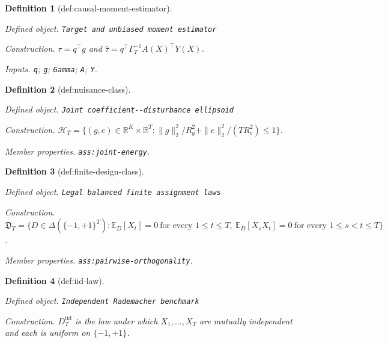 \documentclass{article}
\newtheorem{definition}{Definition}
\begin{document}
\begin{definition}[def:causal-moment-estimator]\label{def:causal-moment-estimator}
\par\smallskip\noindent\emph{Defined object.} \texttt{Target and unbiased moment estimator}
\par\smallskip\noindent\emph{Construction.} \(\tau=q^{\top}g\) and \(\widehat\tau=q^{\top}\Gamma_T^{-1}A(X)^{\top}Y(X)\).
\par\smallskip\noindent\emph{Inputs.} \texttt{q}; \texttt{g}; \texttt{Gamma}; \texttt{A}; \texttt{Y}.
\end{definition}

\begin{definition}[def:nuisance-class]\label{def:nuisance-class}
\par\smallskip\noindent\emph{Defined object.} \texttt{Joint coefficient-\allowbreak{}-\allowbreak{}disturbance ellipsoid}
\par\smallskip\noindent\emph{Construction.} \(\mathcal H_T=\{(g,e)\in\mathbb R^K\times\mathbb R^T:\|g\|_2^2/R_g^2+\|e\|_2^2/(T R_e^2)\le 1\}\).
\par\smallskip\noindent\emph{Member properties.} \texttt{ass:\allowbreak{}joint-\allowbreak{}energy}.
\end{definition}

\begin{definition}[def:finite-design-class]\label{def:finite-design-class}
\par\smallskip\noindent\emph{Defined object.} \texttt{Legal balanced finite assignment laws}
\par\smallskip\noindent\emph{Construction.} \(\mathfrak D_T=\{D\in\Delta(\{-1,+1\}^T):\mathbb E_D[X_t]=0\ \text{for every }1\le t\le T,\ \mathbb E_D[X_sX_t]=0\ \text{for every }1\le s<t\le T\}\).
\par\smallskip\noindent\emph{Member properties.} \texttt{ass:\allowbreak{}pairwise-\allowbreak{}orthogonality}.
\end{definition}

\begin{definition}[def:iid-law]\label{def:iid-law}
\par\smallskip\noindent\emph{Defined object.} \texttt{Independent Rademacher benchmark}
\par\smallskip\noindent\emph{Construction.} \(D_T^{\mathrm{iid}}\) is the law under which \(X_1,\ldots,X_T\) are mutually independent and each is uniform on \(\{-1,+1\}\).
\end{definition}
\end{document}
